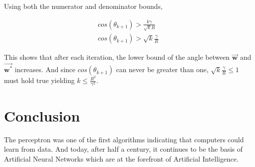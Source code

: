 \documentclass[11pt, a4paper]{article}
\begin{document}
Using both the numerator and denominator bounds,

\begin{align*}
	cos(\theta_{k+1}) > \frac{k\gamma}{\sqrt{k}R} \\
	cos(\theta_{k+1}) > \sqrt{k} \frac{\gamma}{R} 
\end{align*}
 
This shows that after each iteration, the lower bound of the angle between $\vec{\boldsymbol{w}} $ and $\vec{\boldsymbol{w}^*}$ increases. And since $cos(\theta_{k+1})$ can never be greater than one, $\sqrt{k} \frac{\gamma}{R} \leq1$ must hold true yielding $k \leq \frac{R^2}{\gamma^2}$.

\section{Conclusion}

The perceptron was one of the first algorithms indicating that computers could learn from data. And today, after half a century, it continues to be the basis of Artificial Neural Networks which are at the forefront of Artificial Intelligence. 
\end{document}
